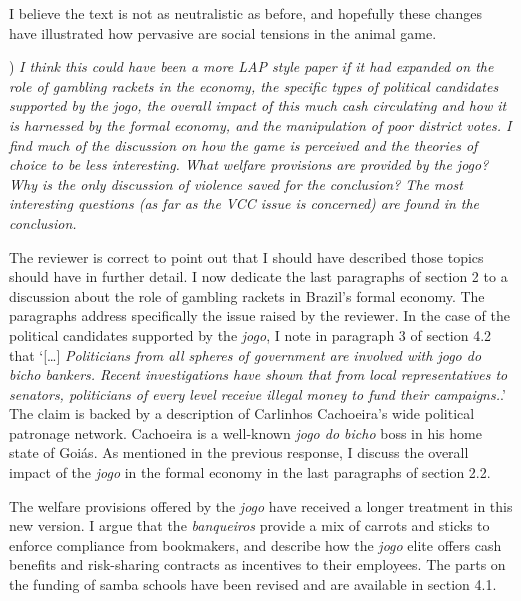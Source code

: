 \documentclass[a4paper,12pt]{article}
\begin{document}
I believe the text is not as neutralistic as before, and hopefully these changes have illustrated how pervasive are social tensions in the animal game.   

\vspace{.5cm}

) \textit{I think this could have been a more LAP style paper if it had expanded on the role of gambling rackets in the economy, the specific types of political candidates supported by the jogo, the overall impact of this much cash circulating and how it is harnessed by the formal economy, and the manipulation of poor district votes. I find much of the discussion on how the game is perceived and the theories of choice to be less interesting. What welfare provisions are provided by the jogo? Why is the only discussion of violence saved for the conclusion? The most interesting questions (as far as the VCC issue is concerned) are found in the conclusion.}

\vspace{.25cm}

The reviewer is correct to point out that I should have described those topics should have in further detail. I now dedicate the last paragraphs of section 2 to a discussion about the role of gambling rackets in Brazil's formal economy. The paragraphs address specifically the issue raised by the reviewer. In the case of the political candidates supported by the \textit{jogo}, I note in paragraph 3 of  section 4.2 that `[\dots] \textit{Politicians from all spheres of government are involved with jogo do bicho bankers. Recent investigations have shown that from local representatives to senators, politicians of every level receive illegal money to fund their campaigns.}.' The claim is backed by a description of Carlinhos Cachoeira's wide political patronage network. Cachoeira is a well-known \textit{jogo do bicho} boss in his home state of Goiás. As mentioned in the previous response, I discuss the overall impact of the \textit{jogo} in the formal economy in the last paragraphs of section 2.2.  

The welfare provisions offered by the \textit{jogo} have received a longer treatment in this new version. I argue that the \textit{banqueiros} provide a mix of carrots and sticks to enforce compliance from bookmakers, and describe how the \textit{jogo} elite offers cash benefits and risk-sharing contracts as incentives to their employees. The parts on the funding of samba schools have been revised and are available in section 4.1.    
\end{document}
